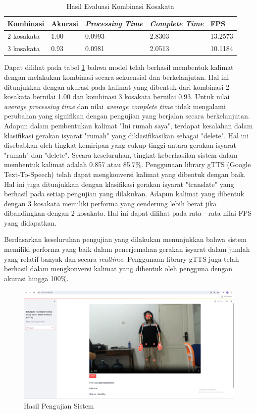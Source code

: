 \begin{table}[H]
  \caption{Hasil Evaluasi Kombinasi Kosakata}
  \label{tb:evaluasiKombinasi}
  \centering
  \begin{tabular}{lllll}
    \hline
    \textbf{Kombinasi} & \textbf{Akurasi} & \emph{\textbf{Processing Time}} & \emph{\textbf{Complete Time}} &\textbf{FPS}\\
    \hline
    2 kosakata & 1.00 & 0.0993 & 2.8303 & 13.2573\\
    3 kosakata & 0.93 & 0.0981 & 2.0513 & 10.1184\\
    \hline
  \end{tabular}
\end{table}

Dapat dilihat pada tabel \ref{tb:evaluasiKombinasi} bahwa model telah berhasil membentuk kalimat dengan melakukan kombinasi secara sekuensial dan berkelanjutan. Hal ini ditunjukkan dengan akurasi pada kalimat yang dibentuk dari kombinasi 2 kosakata bernilai 1.00 dan kombinasi 3 kosakata bernilai 0.93. Untuk nilai \emph{average processing time} dan nilai \emph{average complete time} tidak mengalami perubahan yang signifikan dengan pengujian yang berjalan secara berkelanjutan. Adapun dalam pembentukan kalimat "Ini rumah saya", terdapat kesalahan dalam klasifikasi gerakan isyarat "rumah" yang diklasifikasikan sebagai "delete". Hal ini disebabkan oleh tingkat kemiripan yang cukup tinggi antara gerakan isyarat "rumah" dan "delete". Secara keseluruhan, tingkat keberhasilan sistem dalam membentuk kalimat adalah 0.857 atau 85.7\%. Penggunaan library gTTS (Google Text-To-Speech) telah dapat mengkonversi kalimat yang dibentuk dengan baik. Hal ini juga ditunjukkan dengan klasifikasi gerakan isyarat "translate" yang berhasil pada setiap pengujian yang dilakukan. Adapun kalimat yang dibentuk dengan 3 kosakata memiliki performa yang cenderung lebih berat jika dibandingkan dengan 2 kosakata. Hal ini dapat dilihat pada rata - rata nilai FPS yang didapatkan.

Berdasarkan keseluruhan pengujian yang dilakukan menunjukkan bahwa sistem memiliki performa yang baik dalam penerjemahan gerakan isyarat dalam jumlah yang relatif banyak dan secara \emph{realtime}. Penggunaan library gTTS juga telah berhasil dalam mengkonversi kalimat yang dibentuk oleh pengguna dengan akurasi hingga 100\%.

\begin{figure}[ht]
    \centering

    \includegraphics[scale=0.12]{gambar/bab3-layoutweb.png}
 
    \caption{Hasil Pengujian Sistem}
    \label{fig:layoutweb}
\end{figure}